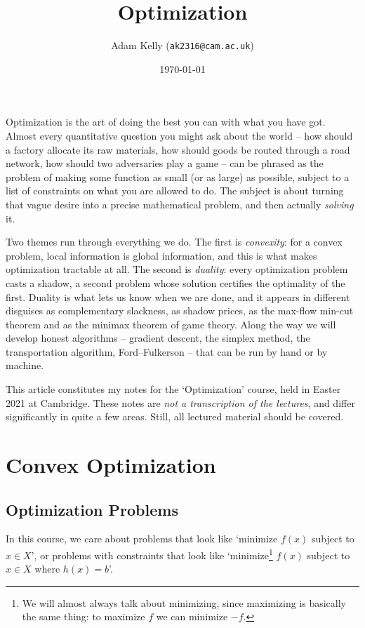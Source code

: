 \documentclass[a4paper]{scrartcl}
\title{Optimization}
\author{Adam Kelly (\texttt{ak2316@cam.ac.uk})}
\date{\today}
\begin{document}
\maketitle

Optimization is the art of doing the best you can with what you have got. Almost every quantitative question you might ask about the world -- how should a factory allocate its raw materials, how should goods be routed through a road network, how should two adversaries play a game -- can be phrased as the problem of making some function as small (or as large) as possible, subject to a list of constraints on what you are allowed to do. The subject is about turning that vague desire into a precise mathematical problem, and then actually \emph{solving} it.

Two themes run through everything we do. The first is \emph{convexity}: for a convex problem, local information is global information, and this is what makes optimization tractable at all. The second is \emph{duality}: every optimization problem casts a shadow, a second problem whose solution certifies the optimality of the first. Duality is what lets us know when we are done, and it appears in different disguises as complementary slackness, as shadow prices, as the max-flow min-cut theorem and as the minimax theorem of game theory. Along the way we will develop honest algorithms -- gradient descent, the simplex method, the transportation algorithm, Ford--Fulkerson -- that can be run by hand or by machine.

This article constitutes my notes for the `Optimization' course, held in Easter 2021 at Cambridge. These notes are \emph{not a transcription of the lectures}, and differ significantly in quite a few areas. Still, all lectured material should be covered.

\tableofcontents

\section{Convex Optimization}

\subsection{Optimization Problems}

In this course, we care about problems that look like `minimize $f(x)$ subject to $x \in X$', or problems with constraints that look like `minimize\footnote{We will almost always talk about minimizing, since maximizing is basically the same thing: to maximize $f$ we can minimize $-f$.} $f(x)$ subject to $x \in X$ where $h(x) = b$'.
\end{document}

